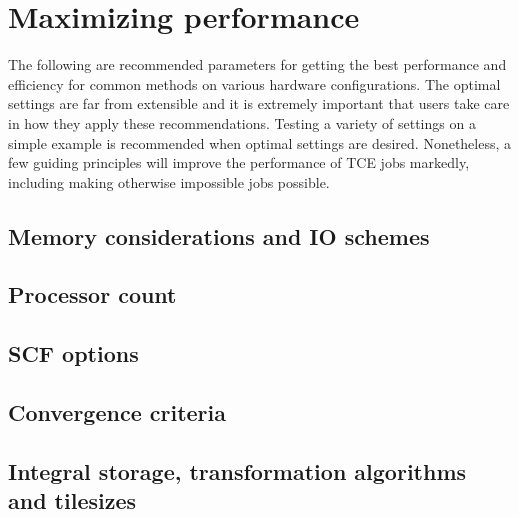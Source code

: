 \section{Maximizing performance}

The following are recommended parameters for getting the best performance and efficiency for common methods on various hardware configurations.  The optimal settings are far from extensible and it is extremely important that users take care in how they apply these recommendations.  Testing a variety of settings on a simple example is recommended when optimal settings are desired.  Nonetheless, a few guiding principles will improve the performance of TCE jobs markedly, including making otherwise impossible jobs possible.

\subsection{Memory considerations and IO schemes}

\subsection{Processor count}

\subsection{SCF options}

\subsection{Convergence criteria}

\subsection{Integral storage, transformation algorithms and tilesizes}

